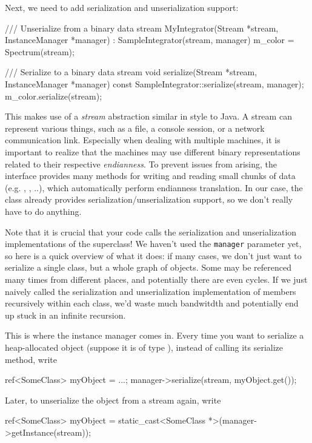 Next, we need to add serialization and unserialization support:
\begin{cpp}
    /// Unserialize from a binary data stream
    MyIntegrator(Stream *stream, InstanceManager *manager)
     : SampleIntegrator(stream, manager) {
        m_color = Spectrum(stream);
    }

    /// Serialize to a binary data stream
    void serialize(Stream *stream, InstanceManager *manager) const {
        SampleIntegrator::serialize(stream, manager);
        m_color.serialize(stream);
    }
\end{cpp}
This makes use of a \emph{stream} abstraction similar in style to Java. 
A stream can represent various things, such as a file, a console session, or a 
network communication link. Especially when dealing with multiple machines,
it is important to realize that the machines may use different binary representations
related to their respective \emph{endianness}. To prevent issues from arising,
the  interface provides many methods for writing and reading 
small chunks of data (e.g. , , ..),
which automatically perform endianness translation. In our case, the
 class already provides serialization/unserialization support,
so we don't really have to do anything.

Note that it is crucial that your code calls the serialization and unserialization 
implementations of the superclass!
We haven't used the \texttt{manager} parameter yet, so here is a quick overview
of what it does: if many cases, we don't just want to serialize a single class,
but a whole graph of objects. Some may be referenced many
times from different places, and potentially there are even cycles. If we just 
naively called the serialization and unserialization implementation of members 
recursively within each class, we'd waste much bandwitdth and potentially 
end up stuck in an infinite recursion.

This is where the instance manager comes in. Every time you want to serialize
a heap-allocated object (suppose it is of type ), 
instead of calling its serialize method, write

\begin{cpp}
ref<SomeClass> myObject = ...;
manager->serialize(stream, myObject.get());
\end{cpp}

Later, to unserialize the object from a stream again, write
\begin{cpp}
ref<SomeClass> myObject = static_cast<SomeClass *>(manager->getInstance(stream));
\end{cpp}

